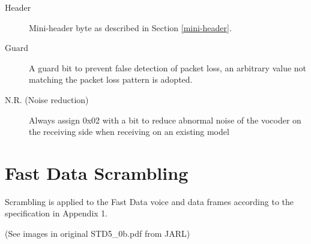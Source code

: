 \documentclass[10pt]{report}
\begin{document}
\small{}
\begin{description}
\item[Header] Mini-header byte as described in Section \ref{mini-header}.
\item[Guard] A guard bit to prevent false detection of packet loss,
  an arbitrary value not matching the packet loss pattern is
  adopted.
\item[N.R. (Noise reduction)] Always assign 0x02 with a bit to
  reduce abnormal noise of the vocoder on the receiving side when
  receiving on an existing model
\end{description}
\normalsize{}

\section{Fast Data Scrambling}

Scrambling is applied to the Fast Data voice and data frames according
to the specification in Appendix 1.

(See images in original STD5\_0b.pdf from JARL)
\end{document}
